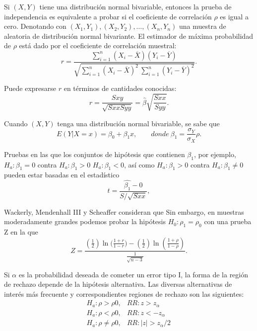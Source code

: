 \documentclass[letterpaper]{article}
\begin{document}
Si $(X, Y)$ tiene una distribución normal bivariable, entonces la prueba de independencia es equivalente a probar si el coeficiente de correlación $\rho$ es igual a cero. Denotando con $(X_1, Y_1), (X_2, Y_2),\ldots , (X_n, Y_n)$ una muestra de aleatoria de distribución normal bivariante. El estimador de máxima probabilidad de $\rho$ está dado por el coeficiente de correlación muestral:
\begin{equation}
r=\frac{\sum_{i=1}^{n}(X_i-\overline{X})(Y_i-\overline{Y})}{\sqrt{\sum_{i=1}^{n}(X_i-\overline{X})^2\ \sum_{i=1}^{n}(Y_i-\overline{Y})^2}}.
\end{equation}

Puede expresarse $r$ en términos de cantidades conocidas:
\begin{equation}
r=\frac{S{xy}}{\sqrt{S{xx}S{yy}}}=\hat{\beta}\sqrt{\frac{S{xx}}{S{yy}}}.
\end{equation}

Cuando $(X, Y)$ tenga una distribución normal bivariable, se sabe que
\begin{equation}
E(Y|X=x)=\beta_0+\beta_1x,\qquad donde\ \beta_1=\frac{\sigma_Y}{\sigma_X}\rho.
\end{equation}

Pruebas en las que los conjuntos de hipótesis que contienen $\beta_1$, por ejemplo, $H_a\colon \beta_1 = 0$ contra $H_a\colon \beta_1 > 0$ $H_a\colon \beta_1 < 0$, así como $H_a\colon \beta_1 > 0$ contra $H_a\colon \beta_1 \neq 0$ pueden estar basadas en el estadístico
\begin{equation}
t=\frac{\hat{\beta_1}-0}{S/\sqrt{S{xx}}},
\end{equation}

Wackerly, Mendenhall III y Scheaffer consideran que \cite[``parecería lógico usar $r$ como estadístico de prueba para probar hipótesis más generales acerca de $\rho$, pero la distribución de probabilidad para $r$ es difícil de obtener."][]{wack09} Sin embargo, en muestras moderadamente grandes podemos probar la hipótesis $H_0\colon \rho_1=\rho_0$ con una prueba Z en la que
\begin{equation}
Z=\frac{(\frac{1}{2})\ln({\frac{1+r}{1-r})}-(\frac{1}{2})\ln(\frac{1+\rho}{1-\rho})}{\frac{1}{\sqrt{n-3}}}.
\end{equation}

Si $\alpha$ es la probabilidad deseada de cometer un error tipo I, la forma de la región de rechazo depende de la hipótesis alternativa. Las diversas alternativas de interés más frecuente y correspondientes regiones de rechazo son las siguientes:
\begin{equation}  
\begin{matrix}
H_a\colon\rho>\rho0, &RR\colon z>z_\alpha\ \ \ \ \ \ \\
H_a\colon\rho<\rho0, &RR\colon z<-z_\alpha\ \ \ \ \\
H_a\colon\rho\neq\rho0, &RR\colon | z | >z_\alpha/2
\end{matrix}
\end{equation}
\end{document}
